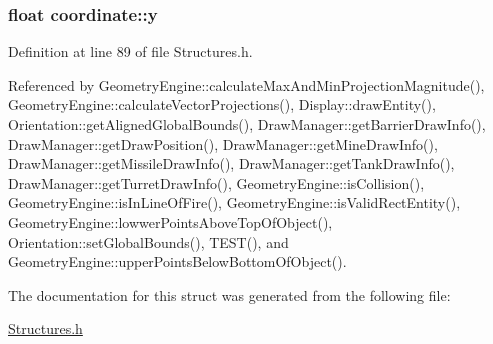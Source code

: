 \hypertarget{structcoordinate_ad48911206c84b1a8306a7023900ff622}{
\subsubsection[{y}]{\setlength{\rightskip}{0pt plus 5cm}float coordinate\-::y}}\label{structcoordinate_ad48911206c84b1a8306a7023900ff622}


Definition at line 89 of file Structures.\-h.



Referenced by Geometry\-Engine\-::calculate\-Max\-And\-Min\-Projection\-Magnitude(), Geometry\-Engine\-::calculate\-Vector\-Projections(), Display\-::draw\-Entity(), Orientation\-::get\-Aligned\-Global\-Bounds(), Draw\-Manager\-::get\-Barrier\-Draw\-Info(), Draw\-Manager\-::get\-Draw\-Position(), Draw\-Manager\-::get\-Mine\-Draw\-Info(), Draw\-Manager\-::get\-Missile\-Draw\-Info(), Draw\-Manager\-::get\-Tank\-Draw\-Info(), Draw\-Manager\-::get\-Turret\-Draw\-Info(), Geometry\-Engine\-::is\-Collision(), Geometry\-Engine\-::is\-In\-Line\-Of\-Fire(), Geometry\-Engine\-::is\-Valid\-Rect\-Entity(), Geometry\-Engine\-::lowwer\-Points\-Above\-Top\-Of\-Object(), Orientation\-::set\-Global\-Bounds(), T\-E\-S\-T(), and Geometry\-Engine\-::upper\-Points\-Below\-Bottom\-Of\-Object().



The documentation for this struct was generated from the following file\-:\begin{DoxyCompactItemize}
\item 
\hyperlink{Structures_8h}{Structures.\-h}\end{DoxyCompactItemize}
